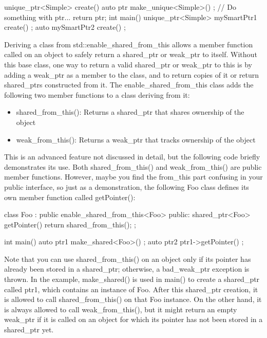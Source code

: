 \begin{cpp}
unique_ptr<Simple> create()
{
    auto ptr { make_unique<Simple>() };
    // Do something with ptr...
    return ptr;
}
int main()
{
    unique_ptr<Simple> mySmartPtr1 { create() };
    auto mySmartPtr2 { create() };
}

\end{cpp}


Deriving a class from std::enable\_shared\_from\_this allows a member function called on an object to safely return a shared\_ptr or weak\_ptr to itself. Without this base class, one way to return a valid shared\_ptr or weak\_ptr to this is by adding a weak\_ptr as a member to the class, and to return copies of it or return shared\_ptrs constructed from it. The enable\_shared\_from\_this class adds the following two member functions to a class deriving from it:

\begin{itemize}
\item
shared\_from\_this(): Returns a shared\_ptr that shares ownership of the object

\item
weak\_from\_this(): Returns a weak\_ptr that tracks ownership of the object
\end{itemize}

This is an advanced feature not discussed in detail, but the following code briefly demonstrates its use. Both shared\_from\_this() and weak\_from\_this() are public member functions. However, maybe you find the from\_this part confusing in your public interface, so just as a demonstration, the following Foo class defines its own member function called getPointer():

\begin{cpp}
class Foo : public enable_shared_from_this<Foo>
{
    public:
        shared_ptr<Foo> getPointer() {
            return shared_from_this();
        }
};

int main()
{
    auto ptr1 { make_shared<Foo>() };
    auto ptr2 { ptr1->getPointer() };
}

\end{cpp}

Note that you can use shared\_from\_this() on an object only if its pointer has already been stored in a shared\_ptr; otherwise, a bad\_weak\_ptr exception is thrown. In the example, make\_shared() is used in main() to create a shared\_ptr called ptr1, which contains an instance of Foo. After this shared\_ptr creation, it is allowed to call shared\_from\_this() on that Foo instance. On the other hand, it is always allowed to call weak\_from\_this(), but it might return an empty weak\_ptr if it is called on an object for which its pointer has not been stored in a shared\_ptr yet.


